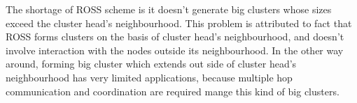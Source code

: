The shortage of ROSS scheme is it doesn't generate big clusters whose sizes exceed the cluster head's neighbourhood.
This problem is attributed to fact that ROSS forms clusters on the basis of cluster head's neighbourhood, and doesn't involve interaction with the nodes outside its neighbourhood.
In the other way around, forming big cluster which extends out side of cluster head's neighbourhood has very limited applications, because multiple hop communication and coordination are required mange this kind of big clusters.



